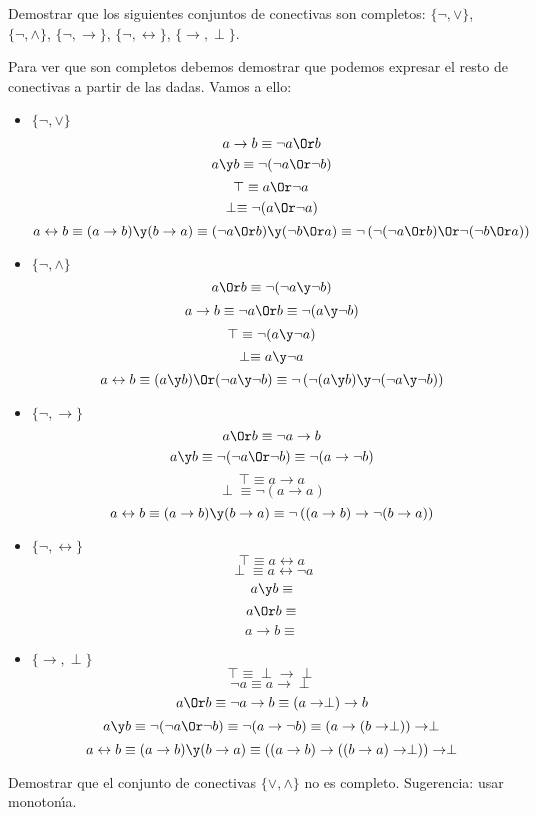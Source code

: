 \begin{problem}[2]
Demostrar que los siguientes conjuntos de conectivas son completos:
$\{\neg, \vee\}$,  $\{\neg, \wedge\}$,  $\{\neg, \to\}$, $\{\neg, \leftrightarrow\}$,
$\{\to, \perp\}$.
\solution

Para ver que son completos debemos demostrar que podemos expresar el resto de conectivas a partir de las dadas. Vamos a ello:

\begin{itemize}
\item \textbf{$\{\neg, \vee\}$}
\[a \to b \equiv \neg a \Or b\]
\[a \y b \equiv \neg( \neg a \Or \neg b)\]
\[\top \equiv a \Or \neg a\]
\[\perp \equiv \neg (a \Or \neg a)\]
\[a \leftrightarrow b \equiv (a \to b) \y (b \to a) \equiv (\neg a \Or b) \y (\neg b \Or a) \equiv \neg \left( \neg (\neg a \Or b) \Or \neg (\neg b \Or a)\right)\]

\item \textbf{$\{\neg, \wedge\}$}
\[a \Or b \equiv \neg( \neg a \y \neg b)\]
\[a \to b \equiv \neg a \Or b \equiv \neg (a \y \neg b)\]
\[\top \equiv \neg (a \y \neg a)\]
\[\perp \equiv a \y \neg a\]
\[a \leftrightarrow b \equiv (a \y b) \Or (\neg a \y \neg b) \equiv \neg \left(\neg(a \y b) \y \neg (\neg a \y \neg b) \right)\]

\item \textbf{$\{\neg, \to\}$}
\[a \Or b \equiv \neg a \to b\]
\[a \y b \equiv \neg ( \neg a \Or \neg b) \equiv \neg ( a \to \neg b)\]
\[\top \equiv a \to a\]
\[\perp \equiv \neg (a \to  a)\]
\[a \leftrightarrow b \equiv (a \to b) \y (b \to a) \equiv \neg \left( (a \to b) \to \neg ( b \to a )\right)\]

\item \textbf{$\{\neg, \leftrightarrow\}$}
\[\top \equiv a \leftrightarrow a\]
\[\perp \equiv a \leftrightarrow \neg a\]
\[a \y b \equiv  \]
\[a \Or b \equiv\]
\[a \to b \equiv\]

\item \textbf{$\{\to, \perp\}$}
\[\top \equiv \perp \to \perp\]
\[\neg a \equiv a \to \perp\]
\[a \Or b \equiv \neg a \to b \equiv (a \to \perp) \to b\]
\[a \y b \equiv \neg ( \neg a \Or \neg b) \equiv \neg (a \to \neg b) \equiv (a \to (b \to \perp))\to \perp\]
\[a \leftrightarrow b \equiv (a \to b ) \y (b \to a ) \equiv ((a \to b )\to ((b \to a ) \to \perp)) \to \perp\]
\end{itemize}

\end{problem}


\begin{problem}[3]
Demostrar que el  conjunto de conectivas $\{\vee, \wedge\}$ no es completo.
Sugerencia: usar monoton\'{\i}a.
\solution

\end{problem}



